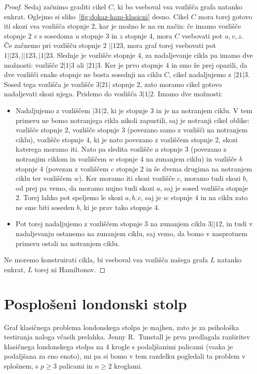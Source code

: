 \documentclass[twoside,11pt]{article}
\begin{document}
\begin{proof}
Sedaj začnimo graditi cikel $C$, ki bo vseboval vsa vozlišča grafa natanko enkrat. Oglejmo si sliko~\ref{fig:dokaz-ham-klasicni} desno.
Cikel $C$ mora torej gotovo iti skozi vsa vozlišča stopnje $2$, kar je možno le na en način: če imamo vozlišče stopnje $2$ $v$ s sosedoma $u$ stopnje $3$ in $z$ stopnje $4$, mora $C$ vsebovati pot $u,v,z$.
Če začnemo pri vozlišču stopnje $2$ $||123$, mora graf torej vsebovati pot $1||23, ||123, |1|23$. Slednje je vozlišče stopnje $4$, za nadaljevanje cikla pa imamo dve možnosti: vozlišče $2|1|3$ ali $|21|3$. Ker je prvo stopnje $4$ in smo že prej opazili, da dve vozlišči enake stopnje ne bosta sosednji na ciklu $C$, cikel nadaljujemo z $|21|3$. Sosed tega vozlišča je vozlišče $3|21|$ stopnje $2$, zato moramo cikel gotovo nadaljevati skozi njega. Pridemo do vozlišča $3|1|2$. Imamo dve možnosti: 
\begin{itemize}[label={--}]
    \item Nadaljujemo z vozliščem $|31|2$, ki je stopnje $3$ in je na notranjem ciklu. V tem primeru ne bomo notranjega cikla nikoli zapustili, saj je notranji cikel oblike: vozlišče stopnje $2$, vozlišče stopnje $3$ (povezano samo z vozlišči na notranjem ciklu), vozlišče stopnje $4$, ki je nato povezano z vozliščem stopnje $2$, skozi katerega moramo iti. Nato pa sledita vozlišče $a$ stopnje $3$ (povezano z notranjim ciklom in vozliščem $w$ stopnje $4$ na zunanjem ciklu) in vozlišče $b$ stopnje $4$ (povezan z vozliščem $c$ stopnje $2$ in še dvema drugima na notranjem ciklu ter vozliščem $w$). Ker moramo iti skozi vozlišče $c$, moramo tudi skozi $b$, od prej pa vemo, da moramo nujno tudi skozi $a$, saj je sosed vozlišča stopnje $2$. Torej lahko pot speljemo le skozi $a,b,c$, saj je $w$ stopnje $4$ in na ciklu zato ne sme biti soseden $b$, ki je prav tako stopnje $4$.
    \item Pot torej nadaljujemo z vozliščem stopnje $3$ na zunanjem ciklu $3||12$, in tudi v nadaljevanju ostanemo na zunanjem ciklu, saj vemo, da bomo v nasprotnem primeru ostali na notranjem ciklu.
\end{itemize}
Ne moremo konstruirati cikla, bi vseboval vsa vozlišča našega grafa $L$ natanko enkrat, $L$ torej ni Hamiltonov.
\qedhere
\end{proof}

\section{Posplošeni londonski stolp}
Graf klasičnega problema londonskega stolpa je majhen, zato je za psihološka testiranja naloga včasih prelahka. 
Jenny R.\ Tunstall je prva predlagala razširitev klasičnega londonskega stolpa na 4 krogle s podaljšanimi palicami (vsaka je podaljšana za eno enoto), mi pa si bomo v tem razdelku pogledali ta problem v splošnem, s $p \geq 3$ palicami in $n \geq 2$ kroglami.
\end{document}

